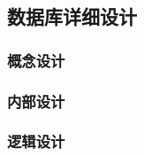 \documentclass{article}
\begin{document}
\subsection{数据库详细设计}

\subsubsection{概念设计}

\subsubsection{内部设计}
\subsubsection{逻辑设计}
\end{document}
